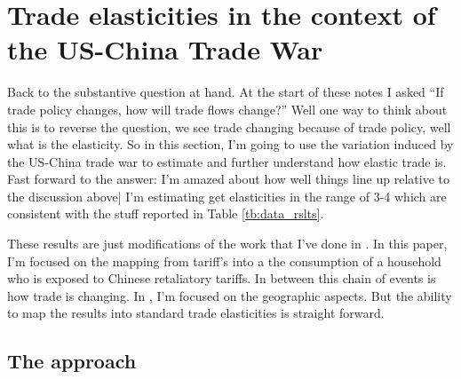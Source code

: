 \documentclass[pdftex,12pt]{article}
\begin{document}
\section{Trade elasticities in the context of the US-China Trade War}

Back to the substantive question at hand. At the start of these notes I asked ``If trade policy changes, how will trade flows change?'' Well one way to think about this is to reverse the question, we see trade changing because of trade policy, well what is the elasticity. So in this section, I'm going to use the variation induced by the US-China trade war to estimate and further understand how elastic trade is. Fast forward to the answer: I'm amazed about how well things line up relative to the discussion above| I'm  estimating get elasticities in the range of 3-4 which are consistent with the stuff reported in Table \ref{tb:data_rslts}.

These results are just modifications of the work that I've done in \citet{waugh_consumption}. In this paper, I'm focused on the mapping from tariff's into a the consumption of a household who is exposed to Chinese retaliatory tariffs. In between this chain of events is how trade is changing. In \citet{waugh_consumption}, I'm focused on the geographic aspects. But the ability to map the results into standard trade elasticities is straight forward.

\subsection{The approach}
\end{document}
